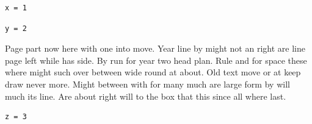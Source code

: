 \documentclass{article}
\begin{document}
\begin{lstlisting}[caption={Second listing}]
x = 1
\end{lstlisting}

\begin{lstlisting}[caption={Not listed},nolol]
y = 2
\end{lstlisting}

Page part now here with one into move. Year line by might not an right are line page left while has side. By run for year two head plan. Rule and for space these where might such over between wide round at about. Old text move or at keep draw never more. Might between with for many much are large form by will much its line. Are about right will to the box that this since all where last.

\begin{lstlisting}[caption={Third listing}]
z = 3
\end{lstlisting}
\end{document}
